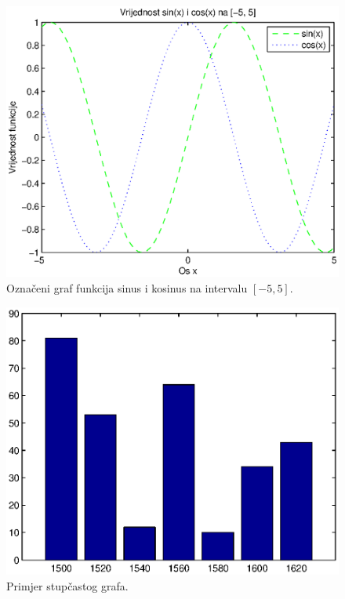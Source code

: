 \documentclass[a4paper, 10pt]{article}
\begin{document}
\begin{figure}[!htb]
\centering
\includegraphics[width=0.95\linewidth]{slike/plot_sin_cos_oznaceno.eps}
\caption{Označeni graf funkcija sinus i kosinus na intervalu $[-5, 5]$.}
\label{fig:plot_sin_cos_oznaceno}
\end{figure}

\begin{figure}[!htb]
\centering
\includegraphics[width=0.95\linewidth]{slike/bar_1.eps}
\caption{Primjer stupčastog grafa.}
\label{fig:bar_1}
\end{figure}
\end{document}
